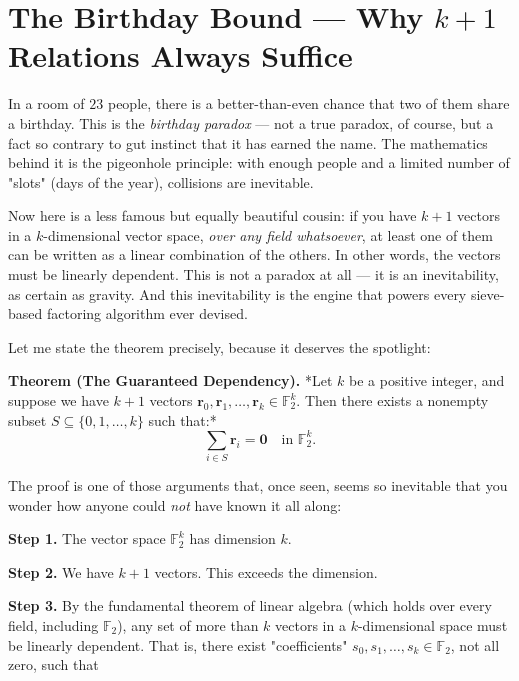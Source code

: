 \bigskip

\section*{The Birthday Bound --- Why $k + 1$ Relations Always Suffice}

In a room of $23$ people, there is a better-than-even chance that two of them share a birthday. This is the \textit{birthday paradox} --- not a true paradox, of course, but a fact so contrary to gut instinct that it has earned the name. The mathematics behind it is the pigeonhole principle: with enough people and a limited number of "slots" (days of the year), collisions are inevitable.

Now here is a less famous but equally beautiful cousin: if you have $k + 1$ vectors in a $k$-dimensional vector space, \textit{over any field whatsoever}, at least one of them can be written as a linear combination of the others. In other words, the vectors must be linearly dependent. This is not a paradox at all --- it is an inevitability, as certain as gravity. And this inevitability is the engine that powers every sieve-based factoring algorithm ever devised.

Let me state the theorem precisely, because it deserves the spotlight:


\begin{displayquote}
\textbf{Theorem (The Guaranteed Dependency).} *Let $k$ be a positive integer, and suppose we have $k + 1$ vectors $\mathbf{r}_0, \mathbf{r}_1, \ldots, \mathbf{r}_k \in \mathbb{F}_2^k$. Then there exists a nonempty subset $S \subseteq \{0, 1, \ldots, k\}$ such that:*
$$\sum_{i \in S} \mathbf{r}_i = \mathbf{0} \quad \text{in } \mathbb{F}_2^k.$$
\end{displayquote}


The proof is one of those arguments that, once seen, seems so inevitable that you wonder how anyone could \textit{not} have known it all along:

\textbf{Step 1.} The vector space $\mathbb{F}_2^k$ has dimension $k$.

\textbf{Step 2.} We have $k + 1$ vectors. This exceeds the dimension.

\textbf{Step 3.} By the fundamental theorem of linear algebra (which holds over every field, including $\mathbb{F}_2$), any set of more than $k$ vectors in a $k$-dimensional space must be linearly dependent. That is, there exist "coefficients" $s_0, s_1, \ldots, s_k \in \mathbb{F}_2$, not all zero, such that

